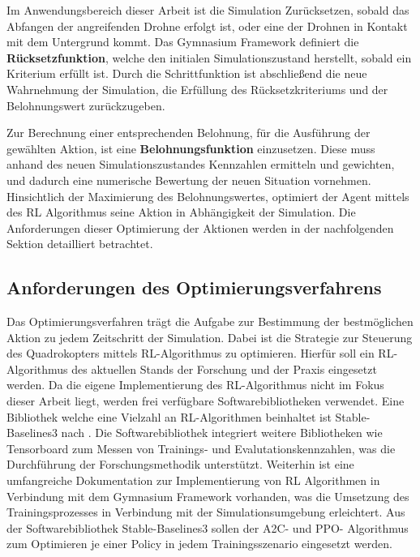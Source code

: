 Im Anwendungsbereich dieser Arbeit ist die Simulation Zurücksetzen, sobald das Abfangen der angreifenden Drohne erfolgt ist, oder eine der Drohnen in Kontakt mit dem Untergrund kommt.
Das Gymnasium Framework definiert die \textbf{Rücksetzfunktion}, welche den initialen Simulationszustand herstellt, sobald ein Kriterium erfüllt ist.
Durch die Schrittfunktion ist abschließend die neue Wahrnehmung der Simulation, die Erfüllung des Rücksetzkriteriums und der Belohnungswert zurückzugeben.

Zur Berechnung einer entsprechenden Belohnung, für die Ausführung der gewählten Aktion, ist eine \textbf{Belohnungsfunktion} einzusetzen.
Diese muss anhand des neuen Simulationszustandes Kennzahlen ermitteln und gewichten, und dadurch eine numerische Bewertung der neuen Situation vornehmen.
Hinsichtlich der Maximierung des Belohnungswertes, optimiert der Agent mittels des RL Algorithmus seine Aktion in Abhängigkeit der Simulation. 
Die Anforderungen dieser Optimierung der Aktionen werden in der nachfolgenden Sektion detailliert betrachtet.

\subsection{Anforderungen des Optimierungsverfahrens}

Das Optimierungsverfahren trägt die Aufgabe zur Bestimmung der bestmöglichen Aktion zu jedem Zeitschritt der Simulation.
Dabei ist die Strategie zur Steuerung des Quadrokopters mittels RL-Algorithmus zu optimieren.
Hierfür soll ein RL-Algorithmus des aktuellen Stands der Forschung und der Praxis eingesetzt werden.
Da die eigene Implementierung des RL-Algorithmus nicht im Fokus dieser Arbeit liegt, werden frei verfügbare Softwarebibliotheken verwendet.
Eine Bibliothek welche eine Vielzahl an RL-Algorithmen beinhaltet ist Stable-Baselines3 nach \cite[]{Raffin.2021}.
Die Softwarebibliothek integriert weitere Bibliotheken wie Tensorboard zum Messen von Trainings- und Evalutationskennzahlen, was die Durchführung der Forschungsmethodik unterstützt.
Weiterhin ist eine umfangreiche Dokumentation zur Implementierung von RL Algorithmen in Verbindung mit dem Gymnasium Framework vorhanden, was die Umsetzung des Trainingsprozesses in Verbindung mit der Simulationsumgebung erleichtert.
Aus der Softwarebibliothek Stable-Baselines3 sollen der A2C- und PPO- Algorithmus zum Optimieren je einer Policy in jedem Trainingsszenario eingesetzt werden. 

